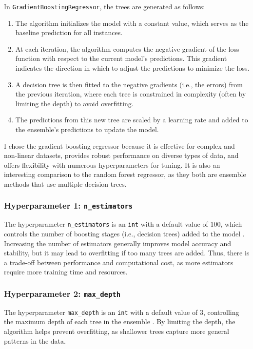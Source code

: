 \documentclass[a4paper, 10pt]{article}
\begin{document}
In \texttt{GradientBoostingRegressor}, the trees are generated as follows:
\begin{enumerate}
    \item   The algorithm initializes the model with a constant value, which serves as the baseline prediction for all instances.

    \item   At each iteration, the algorithm computes the negative gradient of the loss function with respect to the current model's predictions. 
            This gradient indicates the direction in which to adjust the predictions to minimize the loss.

    \item   A decision tree is then fitted to the negative gradients (i.e., the errors) from the previous iteration, where each tree is constrained in complexity (often by limiting the depth) to avoid overfitting.

    \item   The predictions from this new tree are scaled by a learning rate and added to the ensemble's predictions to update the model.
\end{enumerate}

I chose the gradient boosting regressor because it is effective for complex and non-linear datasets, provides robust performance on diverse types of data, and offers flexibility with numerous hyperparameters for tuning.
It is also an interesting comparison to the random forest regressor, as they both are ensemble methods that use multiple decision trees.

\subsubsection{Hyperparameter 1: \texttt{n_estimators}}
The hyperparameter \texttt{n_estimators} is an \texttt{int} with a default value of 100, which controls the number of boosting stages (i.e., decision trees) added to the model \supercite{scikit_gradientboostingregressor}. 
Increasing the number of estimators generally improves model accuracy and stability, but it may lead to overfitting if too many trees are added. 
Thus, there is a trade-off between performance and computational cost, as more estimators require more training time and resources.

\subsubsection{Hyperparameter 2: \texttt{max_depth}}
The hyperparameter \texttt{max_depth} is an \texttt{int} with a default value of 3, controlling the maximum depth of each tree in the ensemble \supercite{scikit_gradientboostingregressor}. 
By limiting the depth, the algorithm helps prevent overfitting, as shallower trees capture more general patterns in the data.
\end{document}
